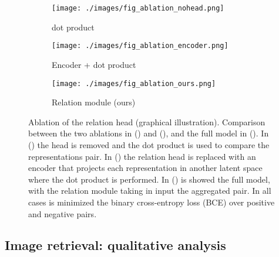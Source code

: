 \documentclass{article}
\begin{document}
\begin{figure}[H]
    \centering
    \begin{subfigure}[t]{0.30\textwidth}
       \centering
        \texttt{[image: ./images/fig\_ablation\_nohead.png]}
        \caption{dot product}
        \label{fig:ablation-nohead}
    \end{subfigure}
    \begin{subfigure}[t]{0.30\textwidth}
       \centering
        \texttt{[image: ./images/fig\_ablation\_encoder.png]}
        \caption{Encoder + dot product}
        \label{fig:ablation-encoder}
    \end{subfigure}
    \begin{subfigure}[t]{0.30\textwidth}
       \centering
        \texttt{[image: ./images/fig\_ablation\_ours.png]}
        \caption{Relation module (ours)}
        \label{fig:ablation-ours}
    \end{subfigure}
    \caption{Ablation of the relation head (graphical illustration). Comparison between the two ablations in () and (), and the full model in (). In () the head is removed and the dot product  is used to compare the representations pair. In () the relation head is replaced with an encoder  that projects each representation in another latent space where the dot product is performed. In () is showed the full model, with the relation module  taking in input the aggregated pair. In all cases is minimized the binary cross-entropy loss (BCE) over positive and negative pairs.}
    \label{fig:ablation}
\end{figure}

\subsection{Image retrieval: qualitative analysis}\label{appendix:additional_retrieval}
\FloatBarrier
\end{document}
